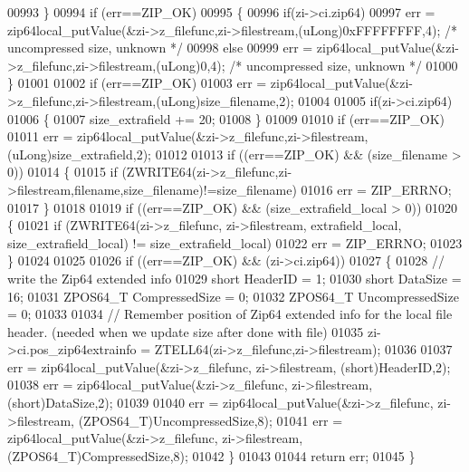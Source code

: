 \begin{DoxyCode}
00993   \}
00994   \textcolor{keywordflow}{if} (err==ZIP\_OK)
00995   \{
00996     \textcolor{keywordflow}{if}(zi->ci.zip64)
00997       err = zip64local\_putValue(&zi->z\_filefunc,zi->filestream,(uLong)0xFFFFFFFF,4); \textcolor{comment}{/* uncompressed size,
       unknown */}
00998     \textcolor{keywordflow}{else}
00999       err = zip64local\_putValue(&zi->z\_filefunc,zi->filestream,(uLong)0,4); \textcolor{comment}{/* uncompressed size, unknown 
      */}
01000   \}
01001 
01002   \textcolor{keywordflow}{if} (err==ZIP\_OK)
01003     err = zip64local\_putValue(&zi->z\_filefunc,zi->filestream,(uLong)size\_filename,2);
01004 
01005   \textcolor{keywordflow}{if}(zi->ci.zip64)
01006   \{
01007     size\_extrafield += 20;
01008   \}
01009 
01010   \textcolor{keywordflow}{if} (err==ZIP\_OK)
01011     err = zip64local\_putValue(&zi->z\_filefunc,zi->filestream,(uLong)size\_extrafield,2);
01012 
01013   \textcolor{keywordflow}{if} ((err==ZIP\_OK) && (size\_filename > 0))
01014   \{
01015     \textcolor{keywordflow}{if} (ZWRITE64(zi->z\_filefunc,zi->filestream,filename,size\_filename)!=size\_filename)
01016       err = ZIP\_ERRNO;
01017   \}
01018 
01019   \textcolor{keywordflow}{if} ((err==ZIP\_OK) && (size\_extrafield\_local > 0))
01020   \{
01021     \textcolor{keywordflow}{if} (ZWRITE64(zi->z\_filefunc, zi->filestream, extrafield\_local, size\_extrafield\_local) != 
      size\_extrafield\_local)
01022       err = ZIP\_ERRNO;
01023   \}
01024 
01025 
01026   \textcolor{keywordflow}{if} ((err==ZIP\_OK) && (zi->ci.zip64))
01027   \{
01028       \textcolor{comment}{// write the Zip64 extended info}
01029       \textcolor{keywordtype}{short} HeaderID = 1;
01030       \textcolor{keywordtype}{short} DataSize = 16;
01031       ZPOS64\_T CompressedSize = 0;
01032       ZPOS64\_T UncompressedSize = 0;
01033 
01034       \textcolor{comment}{// Remember position of Zip64 extended info for the local file header. (needed when we update size
       after done with file)}
01035       zi->ci.pos\_zip64extrainfo = ZTELL64(zi->z\_filefunc,zi->filestream);
01036 
01037       err = zip64local\_putValue(&zi->z\_filefunc, zi->filestream, (\textcolor{keywordtype}{short})HeaderID,2);
01038       err = zip64local\_putValue(&zi->z\_filefunc, zi->filestream, (\textcolor{keywordtype}{short})DataSize,2);
01039 
01040       err = zip64local\_putValue(&zi->z\_filefunc, zi->filestream, (ZPOS64\_T)UncompressedSize,8);
01041       err = zip64local\_putValue(&zi->z\_filefunc, zi->filestream, (ZPOS64\_T)CompressedSize,8);
01042   \}
01043 
01044   \textcolor{keywordflow}{return} err;
01045 \}

\end{DoxyCode}

